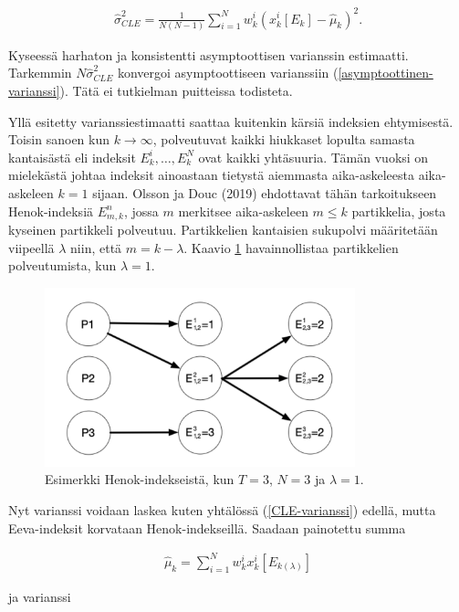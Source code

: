 \documentclass[
  12pt,
  a4paper, twoside]{book}
\begin{document}
\begin{align}\label{CLE-varianssi}
\hat{\sigma}^2_{CLE} = \frac{1}{N(N-1)} \sum_{i=1}^N w_k^i (x_k^i[E_k]-\hat{\mu}_k)^2
.\end{align}

\noindent Kyseessä harhaton ja konsistentti asymptoottisen varianssin estimaatti. Tarkemmin \(N\hat{\sigma}^2_{CLE}\) konvergoi asymptoottiseen varianssiin (\ref{asymptoottinen-varianssi}). Tätä ei tutkielman puitteissa todisteta.

Yllä esitetty varianssiestimaatti saattaa kuitenkin kärsiä indeksien ehtymisestä. Toisin sanoen kun \(k \to \infty\), polveutuvat kaikki hiukkaset lopulta samasta kantaisästä eli indeksit \(E_k^i,\ldots,E_k^N\) ovat kaikki yhtäsuuria. Tämän vuoksi on mielekästä johtaa indeksit ainoastaan tietystä aiemmasta aika-askeleesta aika-askeleen \(k=1\) sijaan. Olsson ja Douc (2019) \citep{olsson-2019} ehdottavat tähän tarkoitukseen Henok-indeksiä \(E_{m,k}^n\), jossa \(m\) merkitsee aika-askeleen \(m\leq k\) partikkelia, josta kyseinen partikkeli polveutuu. Partikkelien kantaisien sukupolvi määritetään viipeellä \(\lambda\) niin, että \(m=k-\lambda\). Kaavio \ref{fig:henok-indeksit} havainnollistaa partikkelien polveutumista, kun \(\lambda=1\).

\begin{figure}[H]
\centering
\includegraphics[width=9cm]{henokindeksit_korjattu}
\caption{Esimerkki Henok-indekseistä, kun $T=3$, $N=3$ ja $\lambda=1$.}
\label{fig:henok-indeksit}
\end{figure}

Nyt varianssi voidaan laskea kuten yhtälössä (\ref{CLE-varianssi}) edellä, mutta Eeva-indeksit korvataan Henok-indekseillä. Saadaan painotettu summa

\begin{align}\label{OD-sum}
\hat{\mu}_k=\sum_{i=1}^N w_k^i x_k^i[E_{k(\lambda)}]
\end{align}

\noindent ja varianssi
\end{document}

